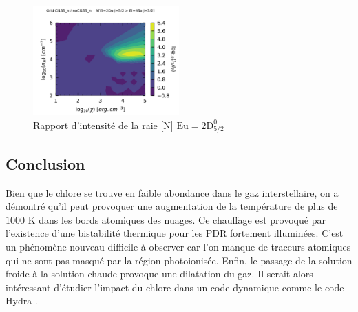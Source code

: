 \begin{figure}[!h]
    \centering \includegraphics[trim = {0 0 0 1cm},clip,width=0.5\textwidth]{figure/Cl/gridModelEmiss/map_Cl155_n_noCl155_nI_N.pdf}
    \caption{Rapport d'intensité de la raie [N] $\mathrm{Eu}=2\mathrm{D}^\mathrm{0}_{5/2}$}
    \label{fig:Cl:gridModelEmiss:N}
\end{figure}


\subsection*{Conclusion}

Bien que le chlore se trouve en faible abondance dans le gaz interstellaire, on a démontré qu'il peut provoquer une augmentation de la température de plus de $1000$ K dans les bords atomiques des nuages. Ce chauffage est provoqué par l'existence d'une bistabilité thermique pour les PDR fortement illuminées. C'est un phénomène nouveau difficile à observer car l'on manque de traceurs atomiques qui ne sont pas masqué par la région photoionisée. Enfin, le passage de la solution froide à la solution chaude provoque une dilatation du gaz. Il serait alors intéressant d'étudier l'impact du chlore dans un code dynamique comme le code Hydra \cite{Bron2018}.







